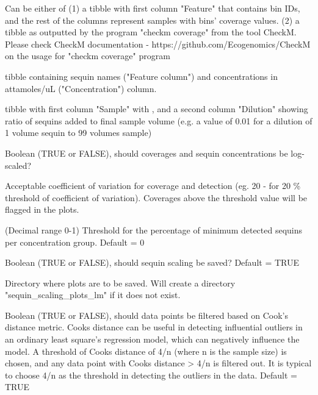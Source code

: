 \documentclass[a4paper]{book}
\begin{document}
\begin{Arguments}
\begin{ldescription}
\item[\code{f\_tibble}] Can be either of
(1) a tibble with first column "Feature" that contains bin IDs, and the rest of the columns represent samples with bins' coverage values.
(2) a tibble as outputted by the program "checkm coverage" from the tool CheckM. Please check CheckM documentation - https://github.com/Ecogenomics/CheckM on the usage for "checkm coverage" program

\item[\code{sequin\_meta}] tibble containing sequin names ("Feature column") and concentrations in attamoles/uL ("Concentration") column.

\item[\code{seq\_dilution}] tibble with first column "Sample" with , and a second column "Dilution" showing ratio of sequins added to final sample volume (e.g. a value of 0.01 for a dilution of 1 volume sequin to 99 volumes sample)

\item[\code{log\_trans}] Boolean (TRUE or FALSE), should coverages and sequin concentrations be log-scaled?

\item[\code{coe\_of\_variation}] Acceptable coefficient of variation for coverage and detection (eg. 20 - for 20 \% threshold of coefficient of variation). Coverages above the threshold value will be flagged in the plots.

\item[\code{lod\_limit}] (Decimal range 0-1) Threshold for the percentage of minimum detected sequins per concentration group. Default = 0

\item[\code{save\_plots}] Boolean (TRUE or FALSE), should sequin scaling be saved? Default = TRUE

\item[\code{plot\_dir}] Directory where plots are to be saved. Will create a directory "sequin\_scaling\_plots\_lm" if it does not exist.

\item[\code{cook\_filtering}] Boolean (TRUE or FALSE), should data points be filtered based on Cook's distance metric. Cooks distance can be useful in detecting influential outliers in an ordinary least square’s regression model, which can negatively influence the model. A threshold of Cooks distance of 4/n (where n is the sample size) is chosen, and any data point with Cooks distance > 4/n is filtered out. It is typical to choose 4/n as the threshold in detecting the outliers in the data. Default = TRUE
\end{ldescription}
\end{Arguments}
\end{document}
